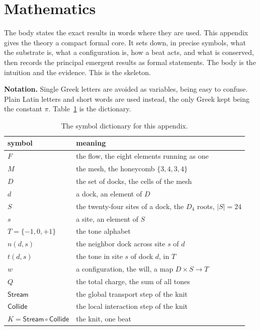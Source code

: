 \section{Mathematics}

The body states the exact results in words where they are used. This appendix gives the theory a compact formal core. It sets down, in precise symbols, what the substrate is, what a configuration is, how a beat acts, and what is conserved, then records the principal emergent results as formal statements. The body is the intuition and the evidence. This is the skeleton.

\textbf{Notation.} Single Greek letters are avoided as variables, being easy to confuse. Plain Latin letters and short words are used instead, the only Greek kept being the constant $\pi$. Table~\ref{tab:symbols} is the dictionary.

\begin{table}[ht]
\centering
\small
\begin{tabular}{@{}ll@{}}
\toprule
symbol & meaning \\
\midrule
$F$ & the flow, the eight elements running as one \\
$M$ & the mesh, the honeycomb $\{3,4,3,4\}$ \\
$D$ & the set of docks, the cells of the mesh \\
$d$ & a dock, an element of $D$ \\
$S$ & the twenty-four sites of a dock, the $D_4$ roots, $|S| = 24$ \\
$s$ & a site, an element of $S$ \\
$T = \{-1,0,+1\}$ & the tone alphabet \\
$n(d, s)$ & the neighbor dock across site $s$ of $d$ \\
$t(d, s)$ & the tone in site $s$ of dock $d$, in $T$ \\
$w$ & a configuration, the will, a map $D \times S \to T$ \\
$Q$ & the total charge, the sum of all tones \\
$\mathsf{Stream}$ & the global transport step of the knit \\
$\mathsf{Collide}$ & the local interaction step of the knit \\
$K = \mathsf{Stream} \circ \mathsf{Collide}$ & the knit, one beat \\
\bottomrule
\end{tabular}
\caption{The symbol dictionary for this appendix.}
\label{tab:symbols}
\end{table}

